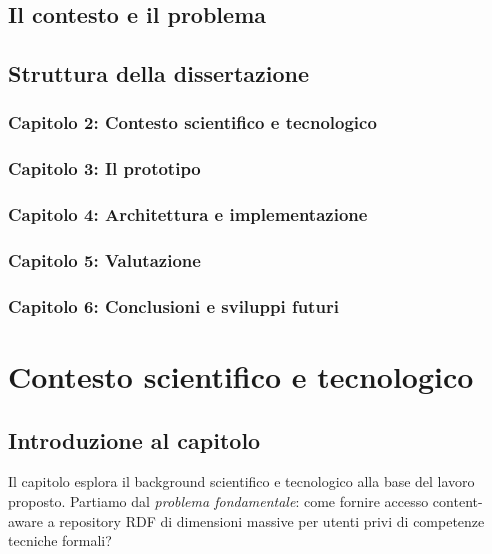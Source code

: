 \documentclass[12pt,a4paper,oneside]{book}
\begin{document}
\section{Il contesto e il problema}\label{sec:intro_problema}




\section{Struttura della dissertazione}\label{sec:intro_struttura}



\subsection*{Capitolo 2: Contesto scientifico e tecnologico}


\subsection*{Capitolo 3: Il prototipo}


\subsection*{Capitolo 4: Architettura e implementazione}


\subsection*{Capitolo 5: Valutazione}


\subsection*{Capitolo 6: Conclusioni e sviluppi futuri}
%
 
\chapter{Contesto scientifico e tecnologico}\label{chap:contesto}

\section{Introduzione al capitolo}\label{sec:intro_cap2}

Il capitolo esplora il background scientifico e tecnologico alla base del lavoro proposto.
Partiamo dal \textit{problema fondamentale}: come fornire accesso content-aware a repository RDF di dimensioni massive per utenti privi di competenze tecniche formali?
\end{document}
